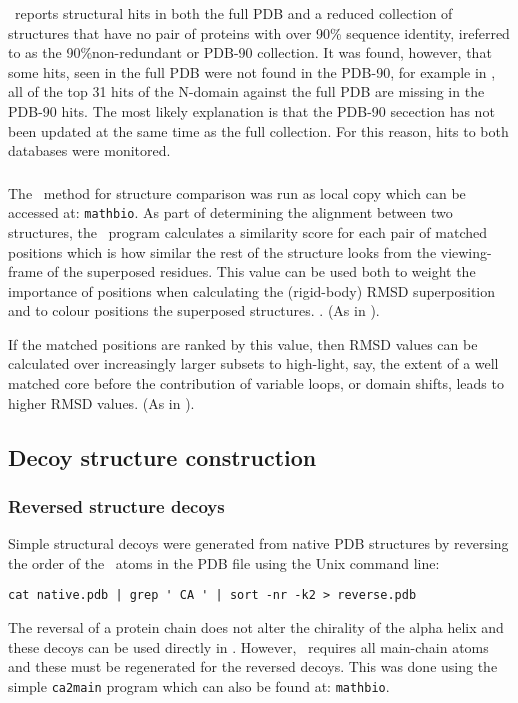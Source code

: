 \DALI\ reports structural hits in both the full PDB and a reduced collection of structures that
have no pair of proteins with over 90\% sequence identity, ireferred to as the 90\%non-redundant or PDB-90 collection.
It was found, however, that some hits, seen in the full PDB were not found in the PDB-90, for example in ,
all of the top 31 hits of the N-domain against the full PDB are missing in the PDB-90 hits.
The most likely explanation is that the PDB-90 secection has not been updated at the same time
as the full collection.    For this reason, hits to both databases were monitored.

\subsubsection{\SAP}

The \SAP\ method for structure comparison \cite{TaylorWR99a} was run as local copy which can
be accessed at: {\tt mathbio}.   As part of determining the alignment between two structures,
the \SAP\ program calculates a similarity score for each pair of matched positions which is
how similar the rest of the structure looks from the viewing-frame of the superposed residues.
This value can be used both to weight the importance of positions when calculating the
(rigid-body) RMSD superposition and to colour positions the superposed structures.
\cite{}. (As in \Fig{}).

If the matched positions are ranked by this value, then RMSD values can be calculated over
increasingly larger subsets to high-light, say, the extent of a well matched core before
the contribution of variable loops, or domain shifts, leads to higher RMSD values.
(As in ).

\subsection{Decoy structure construction}

\subsubsection{Reversed structure decoys}

Simple structural decoys were generated from native PDB structures by reversing the order
of the \CA\ atoms in the PDB file using the Unix command line:
\begin{verbatim}
cat native.pdb | grep ' CA ' | sort -nr -k2 > reverse.pdb
\end{verbatim}
The reversal of a protein chain does not alter the chirality of the alpha helix and
these decoys can be used directly in \SAP.   However, \DALI\ requires all main-chain atoms
and these must be regenerated for the reversed decoys.   This was done using the simple
{\tt ca2main} program which can also be found at: {\tt  mathbio}.

